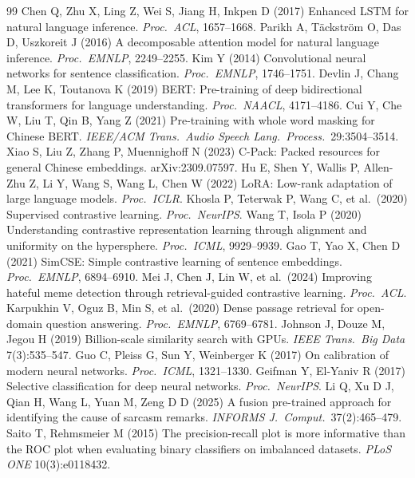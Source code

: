 \documentclass[11pt]{article}
\begin{document}
\begin{thebibliography}{99}
\small
{} Chen Q, Zhu X, Ling Z, Wei S, Jiang H, Inkpen D (2017)
Enhanced LSTM for natural language inference. \textit{Proc.\ ACL}, 1657--1668.
 Parikh A, T\"ackstr\"om O, Das D, Uszkoreit J (2016) A
decomposable attention model for natural language inference. \textit{Proc.\
EMNLP}, 2249--2255.
 Kim Y (2014) Convolutional neural networks for sentence
classification. \textit{Proc.\ EMNLP}, 1746--1751.
 Devlin J, Chang M, Lee K, Toutanova K (2019) BERT:
Pre-training of deep bidirectional transformers for language understanding.
\textit{Proc.\ NAACL}, 4171--4186.
 Cui Y, Che W, Liu T, Qin B, Yang Z (2021) Pre-training with
whole word masking for Chinese BERT. \textit{IEEE/ACM Trans.\ Audio Speech
Lang.\ Process.}\ 29:3504--3514.
 Xiao S, Liu Z, Zhang P, Muennighoff N (2023) C-Pack: Packed
resources for general Chinese embeddings. arXiv:2309.07597.
 Hu E, Shen Y, Wallis P, Allen-Zhu Z, Li Y, Wang S, Wang L,
Chen W (2022) LoRA: Low-rank adaptation of large language models.
\textit{Proc.\ ICLR}.
 Khosla P, Teterwak P, Wang C, et al.\ (2020) Supervised
contrastive learning. \textit{Proc.\ NeurIPS}.
 Wang T, Isola P (2020) Understanding contrastive
representation learning through alignment and uniformity on the hypersphere.
\textit{Proc.\ ICML}, 9929--9939.
 Gao T, Yao X, Chen D (2021) SimCSE: Simple contrastive
learning of sentence embeddings. \textit{Proc.\ EMNLP}, 6894--6910.
\bibitem{mei2024} Mei J, Chen J, Lin W, et al.\ (2024) Improving hateful meme
detection through retrieval-guided contrastive learning. \textit{Proc.\ ACL}.
\bibitem{karpukhin2020} Karpukhin V, Oguz B, Min S, et al.\ (2020) Dense
passage retrieval for open-domain question answering. \textit{Proc.\ EMNLP},
6769--6781.
 Johnson J, Douze M, Jegou H (2019) Billion-scale
similarity search with GPUs. \textit{IEEE Trans.\ Big Data} 7(3):535--547.
\bibitem{guo2017} Guo C, Pleiss G, Sun Y, Weinberger K (2017) On calibration of
modern neural networks. \textit{Proc.\ ICML}, 1321--1330.
 Geifman Y, El-Yaniv R (2017) Selective classification for
deep neural networks. \textit{Proc.\ NeurIPS}.
 Li Q, Xu D J, Qian H, Wang L, Yuan M, Zeng D D (2025) A fusion
pre-trained approach for identifying the cause of sarcasm remarks.
\textit{INFORMS J.\ Comput.}\ 37(2):465--479.
 Saito T, Rehmsmeier M (2015) The precision-recall plot is
more informative than the ROC plot when evaluating binary classifiers on
imbalanced datasets. \textit{PLoS ONE} 10(3):e0118432.
\end{thebibliography}
\end{document}
